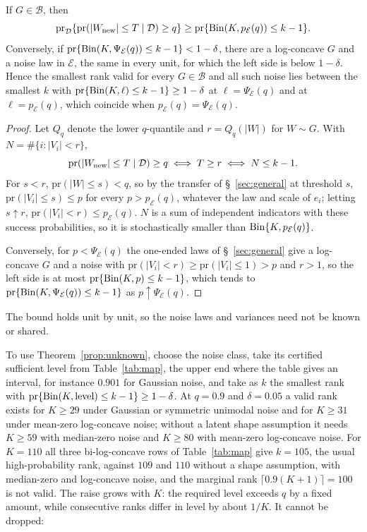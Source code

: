 \documentclass[lineno]{biometrika}
\newcommand{\pr}{\mathrm{pr}}
\begin{document}
\begin{theorem}\label{prop:unknown}
If $G \in \mathcal B$, then
\[
\pr_{\mathcal D}\{\pr(|W_{\rm new}| \le T \mid \mathcal D) \ge q\} \ge \pr\{{\rm Bin}(K, p_{\mathcal E}(q)) \le k - 1\}.
\]
Conversely, if $\pr\{{\rm Bin}(K, \Psi_{\mathcal E}(q)) \le k - 1\} < 1 - \delta$, there are a log-concave $G$ and a noise law in $\mathcal E$, the same in every unit, for which the left side is below $1 - \delta$. Hence the smallest rank valid for every $G \in \mathcal B$ and all such noise lies between the smallest $k$ with $\pr\{{\rm Bin}(K, \ell) \le k - 1\} \ge 1 - \delta$ at $\ell = \Psi_{\mathcal E}(q)$ and at $\ell = p_{\mathcal E}(q)$, which coincide when $p_{\mathcal E}(q) = \Psi_{\mathcal E}(q)$.
\end{theorem}

\begin{proof}
Let $Q_q$ denote the lower $q$-quantile and $r = Q_q(|W|)$ for $W \sim G$. With $N = \#\{i : |V_i| < r\}$,
\[
\pr(|W_{\rm new}| \le T \mid \mathcal D) \ge q \iff T \ge r \iff N \le k - 1.
\] For $s < r$, $\pr(|W| \le s) < q$, so by the transfer of \S~\ref{sec:general} at threshold $s$, $\pr(|V_i| \le s) \le p$ for every $p > p_{\mathcal E}(q)$, whatever the law and scale of $e_i$; letting $s \uparrow r$, $\pr(|V_i| < r) \le p_{\mathcal E}(q)$. $N$ is a sum of independent indicators with these success probabilities, so it is stochastically smaller than ${\rm Bin}\{K, p_{\mathcal E}(q)\}$.

Conversely, for $p < \Psi_{\mathcal E}(q)$ the one-ended laws of \S~\ref{sec:general} give a log-concave $G$ and a noise with $\pr(|V_i| < r) \ge \pr(|V_i| \le 1) > p$ and $r > 1$, so the left side is at most $\pr\{{\rm Bin}(K, p) \le k - 1\}$, which tends to $\pr\{{\rm Bin}(K, \Psi_{\mathcal E}(q)) \le k - 1\}$ as $p \uparrow \Psi_{\mathcal E}(q)$.
\end{proof}

The bound holds unit by unit, so the noise laws and variances need not be known or shared.

To use Theorem~\ref{prop:unknown}, choose the noise class, take its certified sufficient level from Table~\ref{tab:map}, the upper end where the table gives an interval, for instance $0.901$ for Gaussian noise, and take as $k$ the smallest rank with $\pr\{{\rm Bin}(K, \text{level}) \le k - 1\} \ge 1 - \delta$. At $q = 0.9$ and $\delta = 0.05$ a valid rank exists for $K \ge 29$ under Gaussian or symmetric unimodal noise and for $K \ge 31$ under mean-zero log-concave noise; without a latent shape assumption it needs $K \ge 59$ with median-zero noise and $K \ge 80$ with mean-zero log-concave noise. For $K = 110$ all three bi-log-concave rows of Table~\ref{tab:map} give $k = 105$, the usual high-probability rank, against $109$ and $110$ without a shape assumption, with median-zero and log-concave noise, and the marginal rank $\lceil 0.9(K+1)\rceil = 100$ is not valid. The raise grows with $K$: the required level exceeds $q$ by a fixed amount, while consecutive ranks differ in level by about $1/K$. It cannot be dropped:
\end{document}

